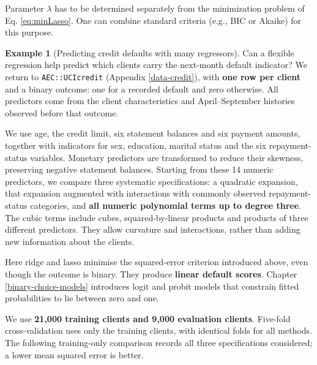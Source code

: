\documentclass[
  11pt,
]{book}
\theoremstyle{definition}
\theoremstyle{definition}
\newtheorem{example}{Example}[chapter]
\theoremstyle{definition}
\theoremstyle{definition}
\theoremstyle{remark}
\begin{document}
Parameter \(\lambda\) has to be determined separately from the minimization problem of Eq. \eqref{eq:minLasso}. One can combine standard criteria (e.g., BIC or Akaike) for this purpose.

\begin{example}[Predicting credit defaults with many regressors]
\protect\hypertarget{exm:credit-shrinkage}{}\label{exm:credit-shrinkage}Can a flexible regression help predict which clients carry the next-month default indicator? We return to \texttt{AEC::UCIcredit} (Appendix \ref{data-credit}), with \textbf{one row per client} and a binary outcome: one for a recorded default and zero otherwise. All predictors come from the client characteristics and April--September histories observed before that outcome.

We use age, the credit limit, six statement balances and six payment amounts, together with indicators for sex, education, marital status and the six repayment-status variables. Monetary predictors are transformed to reduce their skewness, preserving negative statement balances. Starting from these 14 numeric predictors, we compare three systematic specifications: a quadratic expansion, that expansion augmented with interactions with commonly observed repayment-status categories, and \textbf{all numeric polynomial terms up to degree three}. The cubic terms include cubes, squared-by-linear products and products of three different predictors. They allow curvature and interactions, rather than adding new information about the clients.

Here ridge and lasso minimise the squared-error criterion introduced above, even though the outcome is binary. They produce \textbf{linear default scores}. Chapter \ref{binary-choice-models} introduces logit and probit models that constrain fitted probabilities to lie between zero and one.

We use \textbf{21,000 training clients and 9,000 evaluation clients}. Five-fold cross-validation uses only the training clients, with identical folds for all methods. The following training-only comparison records all three specifications considered; a lower mean squared error is better.

\begin{table}[H]
\centering\begingroup\fontsize{10}{12}\selectfont

\endgroup{}
\end{table}


\end{example}
\end{document}
